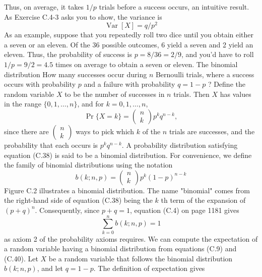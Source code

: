 \documentclass[lang=cn,newtx,10pt,scheme=chinese]{elegantbook}
\begin{document}
Thus, on average, it takes $1 / p$ trials before a success occurs, an intuitive result. As Exercise C.4-3 asks you to show, the variance is
$$
\operatorname{Var}[X]=q / p^2
$$
As an example, suppose that you repeatedly roll two dice until you obtain either a seven or an eleven. Of the 36 possible outcomes, 6 yield a seven and 2 yield an eleven. Thus, the probability of success is $p=8 / 36=2 / 9$, and you'd have to roll $1 / p=9 / 2=4.5$ times on average to obtain a seven or eleven.
The binomial distribution
How many successes occur during $n$ Bernoulli trials, where a success occurs with probability $p$ and a failure with probability $q=1-p$ ? Define the random variable $X$ to be the number of successes in $n$ trials. Then $X$ has values in the range $\{0,1, \ldots, n\}$, and for $k=0,1, \ldots, n$,
$$
\operatorname{Pr}\{X=k\}=\left(\begin{array}{l}
n \\
k
\end{array}\right) p^k q^{n-k},
$$
since there are $\left(\begin{array}{l}n \\ k\end{array}\right)$ ways to pick which $k$ of the $n$ trials are successes, and the probability that each occurs is $p^k q^{n-k}$. A probability distribution satisfying equation (C.38) is said to be a binomial distribution. For convenience, we define the family of binomial distributions using the notation
$$
b(k ; n, p)=\left(\begin{array}{l}
n \\
k
\end{array}\right) p^k(1-p)^{n-k}
$$
Figure C.2 illustrates a binomial distribution. The name "binomial" comes from the right-hand side of equation (C.38) being the $k$ th term of the expansion of $(p+q)^n$. Consequently, since $p+q=1$, equation (C.4) on page 1181 gives
$$
\sum_{k=0}^n b(k ; n, p)=1
$$
as axiom 2 of the probability axioms requires.
We can compute the expectation of a random variable having a binomial distribution from equations (C.9) and (C.40). Let $X$ be a random variable that follows the binomial distribution $b(k ; n, p)$, and let $q=1-p$. The definition of expectation gives
\end{document}
